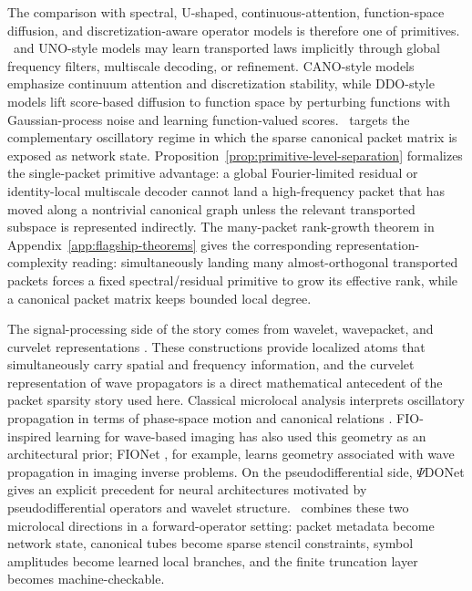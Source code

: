 The comparison with spectral, U-shaped, continuous-attention, function-space diffusion, and discretization-aware operator models is therefore one of primitives.  \FNO\ and UNO-style models may learn transported laws implicitly through global frequency filters, multiscale decoding, or refinement.  CANO-style models emphasize continuum attention and discretization stability, while DDO-style models lift score-based diffusion to function space by perturbing functions with Gaussian-process noise and learning function-valued scores.  \MiNO\ targets the complementary oscillatory regime in which the sparse canonical packet matrix is exposed as network state.  Proposition~\ref{prop:primitive-level-separation} formalizes the single-packet primitive advantage: a global Fourier-limited residual or identity-local multiscale decoder cannot land a high-frequency packet that has moved along a nontrivial canonical graph unless the relevant transported subspace is represented indirectly.  The many-packet rank-growth theorem in Appendix~\ref{app:flagship-theorems} gives the corresponding representation-complexity reading: simultaneously landing many almost-orthogonal transported packets forces a fixed spectral/residual primitive to grow its effective rank, while a canonical packet matrix keeps bounded local degree.

The signal-processing side of the story comes from wavelet, wavepacket, and curvelet representations \citep{mallat2009wavelet,candes2004curvelets,candesdemanet2005curvelet}. These constructions provide localized atoms that simultaneously carry spatial and frequency information, and the curvelet representation of wave propagators is a direct mathematical antecedent of the packet sparsity story used here. Classical microlocal analysis interprets oscillatory propagation in terms of phase-space motion and canonical relations \citep{alazardmicrolocal,hormander1985analysis3,zworski2012semiclassical}. FIO-inspired learning for wave-based imaging has also used this geometry as an architectural prior; FIONet \citep{kothari2020fionet}, for example, learns geometry associated with wave propagation in imaging inverse problems. On the pseudodifferential side, $\Psi$DONet \citep{bubba2021psidonet} gives an explicit precedent for neural architectures motivated by pseudodifferential operators and wavelet structure. \MiNO\ combines these two microlocal directions in a forward-operator setting: packet metadata become network state, canonical tubes become sparse stencil constraints, symbol amplitudes become learned local branches, and the finite truncation layer becomes machine-checkable.


